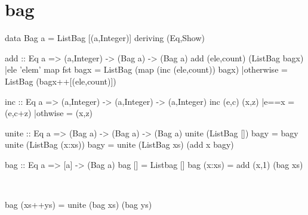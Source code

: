 \section{bag}
\begin{code}
data Bag a = ListBag [(a,Integer)] deriving (Eq,Show)
\end{code}
\begin{code}
add :: Eq a => (a,Integer) -> (Bag a) -> (Bag a)
add (ele,count) (ListBag bagx)
    |ele 'elem' map fst bagx = ListBag (map (inc (ele,count)) bagx) 
    |otherwise               = ListBag (bagx++[(ele,count)])
\end{code}
\begin{code}
inc :: Eq a => (a,Integer) -> (a,Integer) -> (a,Integer)
inc (e,c) (x,z)
    |e==x    = (e,c+z)
    |othwise = (x,z)
\end{code}
\begin{code}
unite :: Eq a => (Bag a) -> (Bag a) -> (Bag a)
unite (ListBag [])     bagy = bagy
unite (ListBag (x:xs)) bagy = unite (ListBag xs) (add x bagy)
\end{code}
\begin{code}
bag :: Eq a => [a] -> (Bag a)
bag []     = Listbag []
bag (x:xs) = add (x,1) (bag xs)
\end{code}
\begin{claim}\label{bagClaim}\ 
\begin{code}
bag (xs++ys) = unite (bag xs) (bag ys) 
\end{code}
\end{claim}

